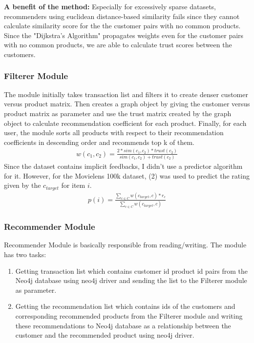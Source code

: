 	\textbf{A benefit of the method:} Especially for excessively sparse datasets, recommenders using euclidean distance-based similarity fails since they cannot calculate similarity score for the the customer pairs with no common products.	Since the  "Dijkstra's Algorithm" propagates weights even for the customer pairs with no common products, we are able to calculate trust scores between the customers.
	
	\subsubsection{Filterer Module} The module initially takes transaction list and filters it to create denser customer versus product matrix. Then creates a graph object by giving the customer versus product matrix as parameter and use the trust matrix created by the graph object to calculate recommendation coefficient for each product. Finally, for each user, the module sorts all products with respect to their recommendation coefficients in descending order and recommends top k of them.
	\begin{equation} 
	\begin{split}
	w(c_{1}, c_{2}) = \frac{2*sim(c_{1},c_{2})*trust(c_{2})}{sim(c_{1},c_{2})+trust(c_{2})}
	\end{split}
	\end{equation}
	Since the dataset contains implicit feedbacks, I didn't use a predictor algorithm for it. However, for the Movielens 100k dataset\cite{Movielens}, (2) was used to predict the rating given by the $c_{target}$ for item $i$.
	\begin{equation} 
	\begin{split}
	p(i) = \frac{\sum_{c \in C}^{} w(c_{target}, c)*r_{c}}{\sum_{c \in C}^{} w(c_{target}, c)}
	\end{split}
	\end{equation}
	\subsubsection{Recommender Module} Recommender Module is basically responsible from reading/writing. The module has two tasks:
	\begin{enumerate}
		\item Getting transaction list which contains customer id product id pairs from the Neo4j database using neo4j driver and sending the list to the Filterer module as parameter.
		\item Getting the recommendation list which contains ids of the customers and corresponding recommended products from the Filterer module and writing these recommendations to Neo4j database as a relationship between the customer and the recommended product using neo4j driver.
	\end{enumerate}